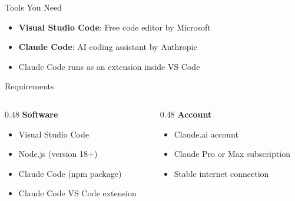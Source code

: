 \documentclass[aspectratio=169,xcolor=dvipsnames]{beamer}
\begin{document}
\begin{frame}{Tools You Need}
  \begin{center}
  \end{center}

  \vspace{1em}
  \begin{itemize}
    \item \textbf{Visual Studio Code}: Free code editor by Microsoft
    \item \textbf{Claude Code}: AI coding assistant by Anthropic
    \item Claude Code runs as an extension inside VS Code
  \end{itemize}
\end{frame}

\begin{frame}{Requirements}
  \begin{columns}[T]
    \begin{column}{0.48\textwidth}
      \textbf{Software}
      \begin{itemize}
        \item Visual Studio Code
        \item Node.js (version 18+)
        \item Claude Code (npm package)
        \item Claude Code VS Code extension
      \end{itemize}
    \end{column}
    \begin{column}{0.48\textwidth}
      \textbf{Account}
      \begin{itemize}
        \item Claude.ai account
        \item Claude Pro or Max subscription
        \item Stable internet connection
      \end{itemize}
    \end{column}
  \end{columns}
\end{frame}
\end{document}

